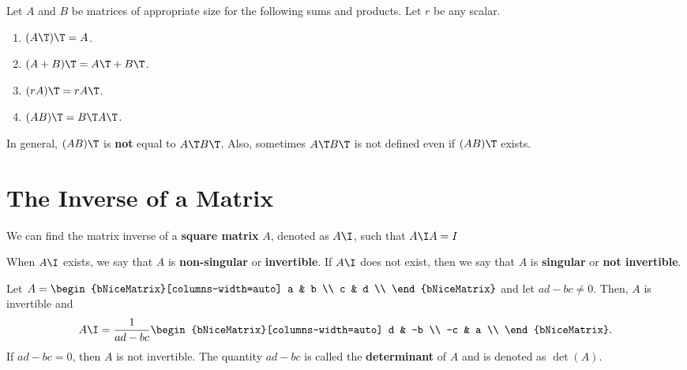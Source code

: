 \begin{theorem}
  \label{thm:properties_of_transpose}

  Let $A$ and $B$ be matrices of appropriate size for the following sums and
  products. Let $r$ be any scalar.
  \begin{enumerate}
    \label{enum:properties_of_transpose}

    \item $(A\T)\T = A$.

    \item $(A + B)\T = A\T + B\T$. 

    \item $(rA)\T = rA\T$.

    \item $(AB)\T = B\T A\T$. 
  \end{enumerate}
\end{theorem}

\begin{note}
  \label{nte:ab_transpose_not_equal_to_a_transpose_b_transpose}

  In general, $(AB)\T$ is \textbf{not} equal to $A\T B\T$. Also, sometimes $A\T
  B\T$ is not defined even if $(AB)\T$ exists.
\end{note}


\section{The Inverse of a Matrix}
\label{sec:the_inverse_of_a_matrix}

We can find the matrix inverse of a \textbf{square matrix} $A$, denoted as
$A\I$, such that $A\I A = I$

When $A\I$ exists, we say that $A$ is \textbf{non-singular} or
\textbf{invertible}. If $A\I$ does not exist, then we say that $A$ is
\textbf{singular} or \textbf{not invertible}.

\begin{definition}
  \label{def:inverse_and_determinant}

  Let $A = \begin{bNiceMatrix}[columns-width=auto]
    a & b \\
    c & d \\
  \end{bNiceMatrix}$ and let $ad - bc \ne 0$. Then, $A$ is invertible and
  \[%
    A\I = \frac{1}{ad - bc}
    \begin{bNiceMatrix}[columns-width=auto]
      d & -b \\
      -c & a \\
    \end{bNiceMatrix}
  .\]%
  If $ad - bc = 0$, then $A$ is not invertible. The quantity $ad - bc$ is called
  the \textbf{determinant} of $A$ and is denoted as $\det(A)$.
\end{definition}

